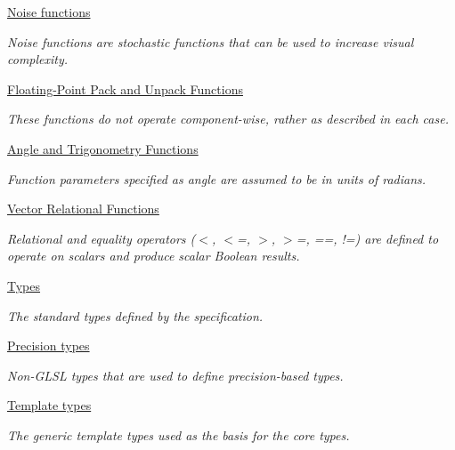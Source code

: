 \begin{DoxyCompactItemize}
\hyperlink{group__core__func__noise}{Noise functions}
\begin{DoxyCompactList}\small\item\em Noise functions are stochastic functions that can be used to increase visual complexity. \end{DoxyCompactList}\item 
\hyperlink{group__core__func__packing}{Floating-\/\-Point Pack and Unpack Functions}
\begin{DoxyCompactList}\small\item\em These functions do not operate component-\/wise, rather as described in each case. \end{DoxyCompactList}\item 
\hyperlink{group__core__func__trigonometric}{Angle and Trigonometry Functions}
\begin{DoxyCompactList}\small\item\em Function parameters specified as angle are assumed to be in units of radians. \end{DoxyCompactList}\item 
\hyperlink{group__core__func__vector__relational}{Vector Relational Functions}
\begin{DoxyCompactList}\small\item\em Relational and equality operators ($<$, $<$=, $>$, $>$=, ==, !=) are defined to operate on scalars and produce scalar Boolean results. \end{DoxyCompactList}\item 
\hyperlink{group__core__types}{Types}
\begin{DoxyCompactList}\small\item\em The standard types defined by the specification. \end{DoxyCompactList}\item 
\hyperlink{group__core__precision}{Precision types}
\begin{DoxyCompactList}\small\item\em Non-\/\-G\-L\-S\-L types that are used to define precision-\/based types. \end{DoxyCompactList}\item 
\hyperlink{group__core__template}{Template types}
\begin{DoxyCompactList}\small\item\em The generic template types used as the basis for the core types. \end{DoxyCompactList}\end{DoxyCompactItemize}


